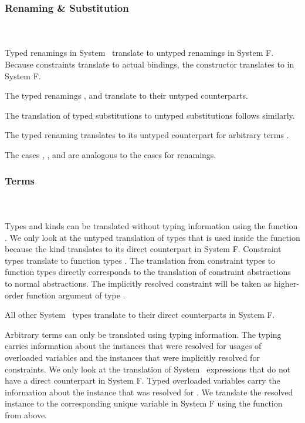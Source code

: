 \subsubsection{Renaming \& Substitution}\hfill\\\\
Typed renamings in System \Fo\ translate to untyped renamings in System F.
\DPTRen
\noindent Because constraints translate to actual bindings, the constructor  translates to  in System F.

\noindent The typed renamings ,  and  translate to their untyped counterparts. 

\noindent The translation of typed substitutions to untyped substitutions follows similarly.
\DPTSub 

\noindent The typed renaming  translates to its untyped counterpart for arbitrary terms .

\noindent The cases , ,  and  are analogous to the cases for renamings. 

\subsubsection{Terms}\hfill\\\\
Types and kinds can be translated without typing information using the function .  
We only look at the untyped translation of types  that is used inside the function  because the kind  translates to its direct counterpart in System F.
\DPTType
Constraint types \Constr{[}  \Constr{:}  \Constr{]⇒}  translate to function types   . 
The translation from constraint types to function types directly corresponds to the translation of constraint abstractions to normal abstractions. 
The implicitly resolved constraint will be taken as higher-order function argument of type  .

\noindent All other System \Fo\ types translate to their direct counterparts in System F.

\noindent Arbitrary terms can only be translated using typing information.
The typing carries information about the instances that were resolved for usages of overloaded variables and the instances that were implicitly resolved for constraints. 
We only look at the translation of System \Fo\ expressions that do not have a direct counterpart in System F.
\newpage
\DPTTerms
Typed overloaded variables  carry the information  about the instance that was resolved for .
We translate the resolved instance to the corresponding unique variable in System F using the  function from above.

